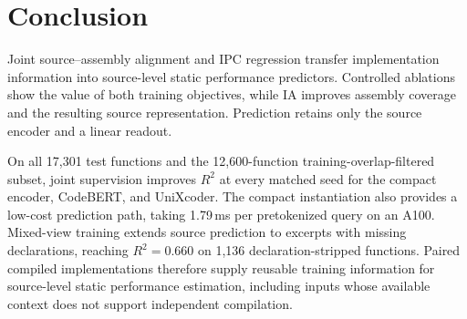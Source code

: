 \documentclass[conference]{IEEEtran}
\newcommand{\Rsq}{R^{2}}
\begin{document}
\section{Conclusion}
Joint source--assembly alignment and IPC regression transfer implementation information into source-level static performance predictors. Controlled ablations show the value of both training objectives, while IA improves assembly coverage and the resulting source representation. Prediction retains only the source encoder and a linear readout.

On all 17,301 test functions and the 12,600-function training-overlap-filtered subset, joint supervision improves $\Rsq$ at every matched seed for the compact encoder, CodeBERT, and UniXcoder. The compact instantiation also provides a low-cost prediction path, taking 1.79\,ms per pretokenized query on an A100. Mixed-view training extends source prediction to excerpts with missing declarations, reaching $\Rsq=0.660$ on 1,136 declaration-stripped functions. Paired compiled implementations therefore supply reusable training information for source-level static performance estimation, including inputs whose available context does not support independent compilation.



\end{document}
